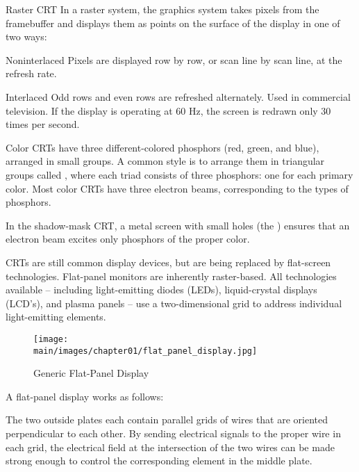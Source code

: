 \documentclass[../COS3712_Notes.tex]{subfiles}
\begin{document}
        \begin{definition}{Raster CRT}
          In a raster system, the graphics system takes pixels from the framebuffer and
          displays them as points on the surface of the display in one of two ways:
          \begin{descriptimize}[nosep]
            \item[Noninterlaced] Pixels are displayed row by row,
            or scan line by scan line, at the refresh rate.
            \item[Interlaced] Odd rows and even rows are refreshed alternately.
            Used in commercial television.
            If the display is operating at 60 Hz, the screen is redrawn only 30 times per second.
          \end{descriptimize}
        \end{definition}

        Color CRTs have three different-colored phosphors (red, green, and blue),
        arranged in small groups.
        A common style is to arrange them in triangular groups called ,
        where each triad consists of three phosphors: one for each primary color.
        Most color CRTs have three electron beams, corresponding to the types of phosphors.

        In the shadow-mask CRT, a metal screen with small holes (the )
        ensures that an electron beam excites only phosphors of the proper color.

        CRTs are still common display devices, but are being replaced by flat-screen technologies.
        Flat-panel monitors are inherently raster-based.
        All technologies available -- including light-emitting diodes (LEDs),
        liquid-crystal displays (LCD's), and plasma panels --
        use a two-dimensional grid to address individual light-emitting elements.
        \pagebreak

        \begin{wrapfigure}{l}{0.4\textwidth}
          \begin{center}
            \texttt{[image: \\main/images/chapter01/flat\_panel\_display.jpg]}
          \end{center}
          \caption{Generic Flat-Panel Display}
        \end{wrapfigure}

        A flat-panel display works as follows:

        The two outside plates each contain parallel grids of wires that are oriented perpendicular
        to each other.
        By sending electrical signals to the proper wire in each grid,
        the electrical field at the intersection of the two wires
        can be made strong enough to control the corresponding element in the middle plate.
\end{document}
